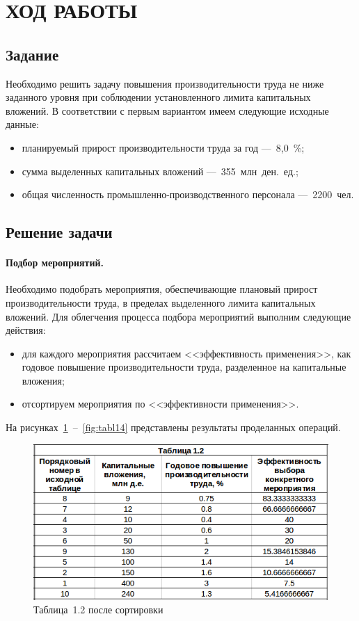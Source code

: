 \section{ХОД РАБОТЫ}

\subsection{Задание}

Необходимо решить задачу повышения производительности труда не ниже заданного уровня
при соблюдении установленного лимита капитальных вложений. В соответствии с первым вариантом
имеем следующие исходные данные:

\begin{itemize}
  \item планируемый прирост производительности труда за год ---~8,0~\%;
  \item сумма выделенных капитальных вложений ---~355~млн~ден.~ед.;
  \item общая численность промышленно-производственного персонала ---~2200~чел.
\end{itemize}

\subsection{Решение задачи}

\paragraph{Подбор мероприятий.}

Необходимо подобрать мероприятия, обеспечивающие плановый прирост производительности
труда, в пределах выделенного лимита капитальных вложений. Для облегчения процесса
подбора мероприятий выполним следующие действия:

\begin{itemize}
  \item для каждого мероприятия рассчитаем <<эффективность применения>>,
    как годовое повышение производительности труда, разделенное на капитальные вложения;
  \item отсортируем мероприятия по <<эффективности применения>>.
\end{itemize}

На рисунках~\ref{fig:tabl12}~--~\ref{fig:tabl14} представлены результаты проделанных операций.

\begin{figure}[htbp]
  \centering
  \includegraphics[width=0.8\linewidth]{img/tabl12}
  \caption{Таблица~1.2 после сортировки}\label{fig:tabl12}
\end{figure}

